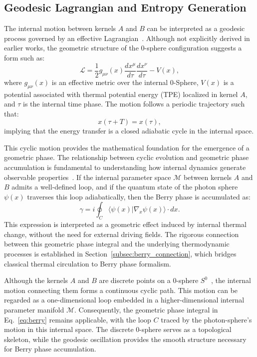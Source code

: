 \documentclass[%
 reprint,
 amsmath,amssymb,
 aps,
]{revtex4-1}
\numberwithin{equation}{section}%
\begin{document}
\subsection{Geodesic Lagrangian and Entropy Generation} \label{subsec:geodesic_lagrangian}

The internal motion between kernels $A$ and $B$ can be interpreted as a geodesic process governed by an effective Lagrangian~\cite{hanamura2506.0119}. Although not explicitly derived in earlier works, the geometric structure of the 0-sphere configuration suggests a form such as:
\begin{equation}
\mathcal{L} = \frac{1}{2} g_{\mu\nu}(x) \frac{dx^\mu}{d\tau} \frac{dx^\nu}{d\tau} - V(x), \label{eq:geo_lagrangian}
\end{equation}
where $g_{\mu\nu}(x)$ is an effective metric over the internal 0-Sphere, $V(x)$ is a potential associated with thermal potential energy (TPE) localized in kernel $A$, and $\tau$ is the internal time phase. The motion follows a periodic trajectory such that:
\begin{equation}
x(\tau + T) = x(\tau), \label{eq:cycle}
\end{equation}
implying that the energy transfer is a closed adiabatic cycle in the internal space.

This cyclic motion provides the mathematical foundation for the emergence of a geometric phase. The relationship between cyclic evolution and geometric phase accumulation is fundamental to understanding how internal dynamics generate observable properties~\cite{anandan1992geometric}. If the internal parameter space $\mathcal{M}$ between kernels $A$ and $B$ admits a well-defined loop, and if the quantum state of the photon sphere $\psi(x)$ traverses this loop adiabatically, then the Berry phase is accumulated as:
\begin{equation}
\gamma = i \oint_C \langle \psi(x) | \nabla_x \psi(x) \rangle \cdot dx. \label{eq:berry}
\end{equation}
This expression is interpreted as a geometric effect induced by internal thermal change, without the need for external driving fields. The rigorous connection between this geometric phase integral and the underlying thermodynamic processes is established in Section~\ref{subsec:berry_connection}, which bridges classical thermal circulation to Berry phase formalism.

Although the kernels $A$ and $B$ are discrete points on a 0-sphere $S^0$~\cite{hanamura1811.0312,hanamura2501.0130}, the internal motion connecting them forms a continuous cyclic path. This motion can be regarded as a one-dimensional loop embedded in a higher-dimensional internal parameter manifold $\mathcal{M}$. Consequently, the geometric phase integral in Eq.~\eqref{eq:berry} remains applicable, with the loop $C$ traced by the photon-sphere's motion in this internal space. The discrete 0-sphere serves as a topological skeleton, while the geodesic oscillation provides the smooth structure necessary for Berry phase accumulation.
\end{document}
